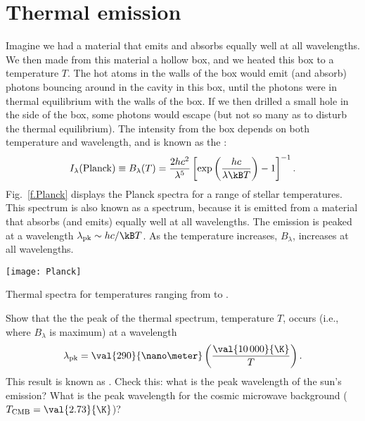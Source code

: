 \section{Thermal emission}
\label{s.thermal-emission}

Imagine we had a material that emits and absorbs equally well at all wavelengths. We then made from this material a hollow box, and we heated this box to a temperature $T$. The hot atoms in the walls of the box would emit (and absorb) photons bouncing around in the cavity in this box, until the photons were in thermal equilibrium with the walls of the box. If we then drilled a small hole in the side of the box, some photons would escape (but not so many as to disturb the thermal equilibrium). The intensity from the box depends on both temperature and wavelength, and is known as the :
\begin{equation}\label{e.planck-spectrum-wavelength}
I_{\lambda}(\mathrm{Planck}) \equiv B_{\lambda}(T) = \frac{2hc^{2}}{\lambda^{5}} \left[\exp\left(\frac{hc}{\lambda\kB T}\right)-1\right]^{-1}.
\end{equation}
Fig.~\ref{f.Planck} displays the Planck spectra for a range of stellar temperatures. This spectrum is also known as a  spectrum, because it is emitted from a material that absorbs (and emits) equally well at all wavelengths. The emission is peaked at a wavelength $\lambda_{\mathrm{pk}} \sim hc/\kB T$. As the temperature increases, $B_{\lambda}$, increases at all wavelengths.
\begin{marginfigure}[-12\baselineskip]
\texttt{[image: Planck]}
\caption[Thermal spectra]{\label{f.Planck}Thermal spectra for temperatures ranging from  to .}
\end{marginfigure}

\begin{exercisebox}\label{ex.Wien-wavelength}
Show that the the peak of the thermal spectrum, temperature $T$, occurs (i.e., where $B_{\lambda}$ is maximum) at a wavelength
\[ \lambda_{\mathrm{pk}} = \val{290}{\nano\meter}\left(\frac{\val{10\,000}{\K}}{T}\right). \]
This result is known as . Check this: what is the peak wavelength of the sun's emission? What is the peak wavelength for the cosmic microwave background ($T_{\mathrm{CMB}} = \val{2.73}{\K}$)?
\end{exercisebox}

